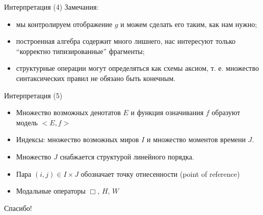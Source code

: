 \documentclass{beamer}
\begin{document}
\begin{frame}{Интерпретация (4)}
Замечания:\\
\bigskip
\begin{itemize}
  \item мы контролируем отображение $g$ и можем сделать его таким, как нам нужно;
  \item построенная алгебра содержит много лишнего, нас интересуют только ``корректно типизированные'' фрагменты;
  \item структурные операции могут определяться как схемы аксиом, т. е. множество синтаксических правил не обязано быть конечным.
\end{itemize}
\end{frame}

\begin{frame}{Интерпретация (5)}
\begin{itemize}
  \item Множество возможных денотатов $E$ и функция означивания $f$ образуют модель $< \! E, f \!>$
  \item Индексы: множество возможных миров $I$ и множество моментов времени $J$.
  \item Множество $J$ снабжается структурой линейного порядка.
  \item Пара $(i, j) \in I \times J$ обозначает точку отнесенности (point of reference)
  \item Модальные операторы $\Box$, $H$, $W$
\end{itemize}
\end{frame}

\begin{frame}{}
    \thispagestyle{empty}
    \begin{center}
        {\large Спасибо!}
    \end{center}
\end{frame}


\end{document}
